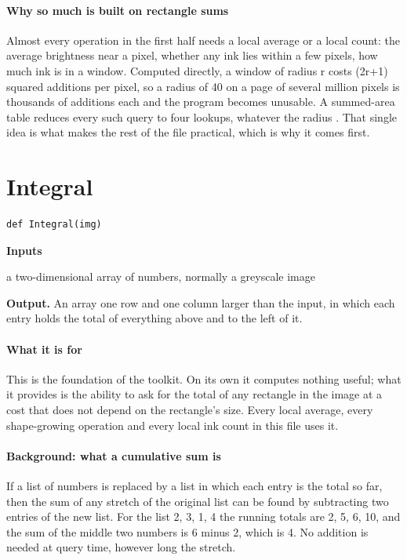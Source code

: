 \paragraph{Why so much is built on rectangle sums}
Almost every operation in the first half needs a local average or a local count: the average brightness near a pixel, whether any ink lies within a few pixels, how much ink is in a window. Computed directly, a window of radius r costs (2r+1) squared additions per pixel, so a radius of 40 on a page of several million pixels is thousands of additions each and the program becomes unusable. A summed-area table reduces every such query to four lookups, whatever the radius \cite{crow1984}. That single idea is what makes the rest of the file practical, which is why it comes first.


\section{Integral}
\begin{lstlisting}[style=sig]
def Integral(img)
\end{lstlisting}

\noindent\textbf{Inputs}
\begin{description}[leftmargin=2.2em,style=nextline,font=\normalfont\ttfamily]\setlength\itemsep{1pt}
  \item[{img}] \normalfont a two-dimensional array of numbers, normally a greyscale image
\end{description}

\noindent\textbf{Output.} An array one row and one column larger than the input, in which each entry holds the total of everything above and to the left of it.


\paragraph{What it is for}
This is the foundation of the toolkit. On its own it computes nothing useful; what it provides is the ability to ask for the total of any rectangle in the image at a cost that does not depend on the rectangle's size. Every local average, every shape-growing operation and every local ink count in this file uses it.


\paragraph{Background: what a cumulative sum is}
If a list of numbers is replaced by a list in which each entry is the total so far, then the sum of any stretch of the original list can be found by subtracting two entries of the new list. For the list 2, 3, 1, 4 the running totals are 2, 5, 6, 10, and the sum of the middle two numbers is 6 minus 2, which is 4. No addition is needed at query time, however long the stretch.

